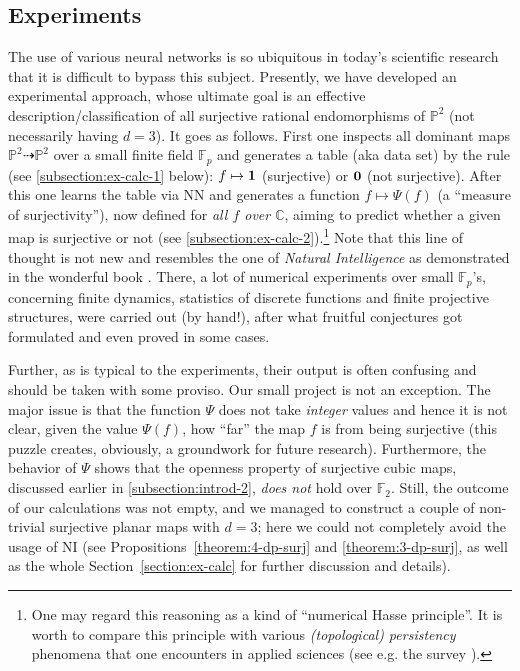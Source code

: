 \documentclass[14pt]{amsart}
\theoremstyle{definition}
\theoremstyle{remark}
\newcommand{\com}{\mathbb{C}}
\newcommand{\p}{\mathbb{P}}
\begin{document}
\subsection{Experiments}
\label{subsection:introd-3}

The use of various neural networks is so ubiquitous in today's
scientific research that it is difficult to bypass this subject.
Presently, we have developed an experimental approach, whose
ultimate goal is an effective description/classification of all
surjective rational endomorphisms of $\p^2$ (not necessarily
having $d = 3$). It goes as follows. First one inspects all
dominant maps $\p^2 \dashrightarrow \p^2$ over a small finite
field $\mathbb{F}_p$ and generates a table (aka data set) by the
rule (see {\ref{subsection:ex-calc-1}} below): $f \mapsto {\bf 1}$
(surjective) or ${\bf 0}$ (not surjective). After this one learns
the table via NN and generates a function $f \mapsto \Psi(f)$ (a
``measure of surjectivity''), now defined for \emph{all $f$ over
$\com$}, aiming to predict whether a given map is surjective or
not (see {\ref{subsection:ex-calc-2}}).\footnote{One may regard
this reasoning as a kind of ``numerical Hasse principle''. It is
worth to compare this principle with various \emph{(topological)
persistency} phenomena that one encounters in applied sciences
(see e.g. the survey \cite{Carlsson}).} Note that this line of
thought is not new and resembles the one of \emph{Natural
Intelligence} as demonstrated in the wonderful book
\cite{Arnold-finite-dyn}. There, a lot of numerical experiments
over small $\mathbb{F}_p$'s, concerning finite dynamics,
statistics of discrete functions and finite projective structures,
were carried out (by hand!), after what fruitful conjectures got
formulated and even proved in some cases.

Further, as is typical to the experiments, their output is often
confusing and should be taken with some proviso. Our small project
is not an exception. The major issue is that the function $\Psi$
does not take \emph{integer} values and hence it is not clear,
given the value $\Psi(f)$, how ``far'' the map $f$ is from being
surjective (this puzzle creates, obviously, a groundwork for
future research). Furthermore, the behavior of $\Psi$ shows that
the openness property of surjective cubic maps, discussed earlier
in {\ref{subsection:introd-2}}, \emph{does not} hold over
$\mathbb{F}_2$. Still, the outcome of our calculations was not
empty, and we managed to construct a couple of non-trivial
surjective planar maps with $d = 3$; here we could not completely
avoid the usage of NI (see Propositions~\ref{theorem:4-dp-surj}
and \ref{theorem:3-dp-surj}, as well as the whole
Section~\ref{section:ex-calc} for further discussion and details).
\end{document}
